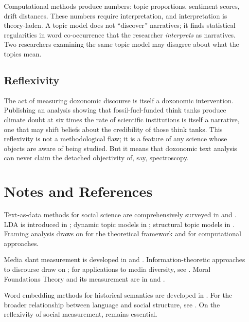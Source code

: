 Computational methods produce numbers: topic proportions, sentiment scores, drift distances.
These numbers require interpretation, and interpretation is theory-laden.
A topic model does not ``discover'' narratives; it finds statistical regularities in word co-occurrence that the researcher \emph{interprets} as narratives.
Two researchers examining the same topic model may disagree about what the topics mean.

\subsection{Reflexivity}

The act of measuring doxonomic discourse is itself a doxonomic intervention.
Publishing an analysis showing that fossil-fuel-funded think tanks produce climate doubt at six times the rate of scientific institutions is itself a narrative, one that may shift beliefs about the credibility of those think tanks.
This reflexivity is not a methodological flaw; it is a feature of any science whose objects are aware of being studied.
But it means that doxonomic text analysis can never claim the detached objectivity of, say, spectroscopy.

\section{Notes and References}
\label{sec:ch17-notes}

Text-as-data methods for social science are comprehensively surveyed in \textcite{grimmer2013} and \textcite{gentzkow2019}.
LDA is introduced in \textcite{blei2003}; dynamic topic models in \textcite{blei2006}; structural topic models in \textcite{roberts2014}.
Framing analysis draws on \textcite{entman1993} for the theoretical framework and \textcite{card2015} for computational approaches.

Media slant measurement is developed in \textcite{gentzkow2010} and \textcite{groseclose2005}.
Information-theoretic approaches to discourse draw on \textcite{shannon1948}; for applications to media diversity, see \textcite{napoli2011}.
Moral Foundations Theory and its measurement are in \textcite{haidt2012} and \textcite{graham2009}.

Word embedding methods for historical semantics are developed in \textcite{hamilton2016}.
For the broader relationship between language and social structure, see \textcite{bourdieu1991}.
On the reflexivity of social measurement, \textcite{hacking1999} remains essential.

